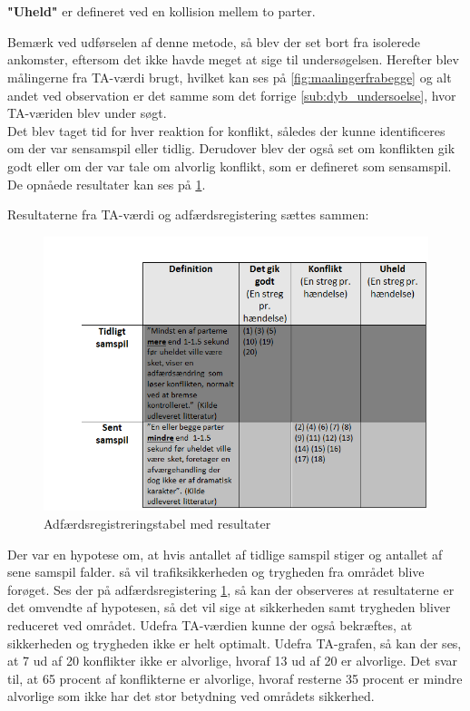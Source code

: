 \\\\
\textbf{"Uheld"} er	defineret	ved	en	kollision	mellem	to	parter.

Bemærk ved udførselen af denne metode, så blev der set bort fra isolerede ankomster, eftersom det ikke havde meget at sige til undersøgelsen. Herefter blev målingerne fra TA-værdi brugt, hvilket kan ses på \cref{fig:maalingerfrabegge} og alt andet ved observation er det samme som det forrige \cref{sub:dyb_undersoelse}, hvor TA-væriden blev under søgt.
\\
Det blev taget tid for hver reaktion for konflikt, således der kunne identificeres om der var sensamspil eller tidlig. Derudover blev der også set om konflikten gik godt eller om der var tale om alvorlig konflikt, som er defineret som sensamspil. De opnåede resultater kan ses på \cref{fig:adfregtabelresult}.


Resultaterne fra TA-værdi og adfærdsregistering sættes sammen:
\begin{figure}[htbp]
  \label{fig:adfregtabelresult}
  \centering
  \begin{adjustbox}{max width=\textwidth}
    \includegraphics{billederogfigur/obstabelresult.png} %
 \end{adjustbox}
  \caption{Adfærdsregistreringstabel med resultater}
\end{figure}

Der var en hypotese om, at hvis antallet af tidlige samspil stiger og antallet af sene samspil falder. så vil trafiksikkerheden og trygheden fra området blive forøget. Ses der på adfærdsregistering \cref{fig:adfregtabelresult}, så kan der observeres at resultaterne er det omvendte af hypotesen, så det vil sige at sikkerheden samt trygheden bliver reduceret ved området. Udefra TA-værdien kunne der også bekræftes, at sikkerheden og trygheden ikke er helt optimalt.
Udefra TA-grafen, så kan der ses, at 7 ud af 20 konflikter ikke er alvorlige, hvoraf 13 ud af 20 er alvorlige. Det svar til, at 65 procent af konflikterne er alvorlige, hvoraf resterne 35 procent er mindre alvorlige som ikke har det stor betydning ved områdets sikkerhed.
